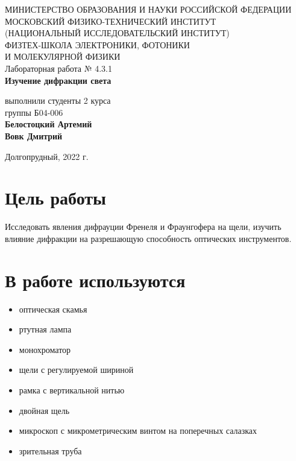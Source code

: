 \documentclass[a4paper,12pt]{article}
\begin{document}
 

\begin{titlepage}
	\begin{center}
		\large 	МИНИСТЕРСТВО ОБРАЗОВАНИЯ И НАУКИ РОССИЙСКОЙ ФЕДЕРАЦИИ\\
				МОСКОВСКИЙ ФИЗИКО-ТЕХНИЧЕСКИЙ ИНСТИТУТ \\
				(НАЦИОНАЛЬНЫЙ ИССЛЕДОВАТЕЛЬСКИЙ ИНСТИТУТ)\\ 
				ФИЗТЕХ-ШКОЛА ЭЛЕКТРОНИКИ, ФОТОНИКИ \\
				И МОЛЕКУЛЯРНОЙ ФИЗИКИ \\
		
		
		\vspace{4.0 cm}
		Лабораторная работа № 4.3.1 \\ 
		\LARGE \textbf{Изучение дифракции света}
	\end{center}
	\vspace{3 cm} \large
	
	\begin{flushright}
		выполнили студенты 2 курса \\
		{группы Б04-006}\\
		\textbf{Белостоцкий Артемий}\\
		\textbf{Вовк Дмитрий}\\
	\end{flushright}
	
	\vfill

	\begin{center}
	Долгопрудный, 2022 г.
	\end{center}
\end{titlepage}                                                                      

\section*{Цель работы}

Исследовать явления дифрауции Френеля и Фраунгофера на щели, изучить влияние дифракции на разрешающую способность оптических инструментов.

\section*{В работе используются}

\begin{itemize}
\item оптическая скамья
\item ртутная лампа
\item монохроматор
\item щели с регулируемой шириной 
\item рамка с вертикальной нитью
\item двойная щель
\item микроскоп с микрометрическим винтом на поперечных салазках
\item зрительная труба
\end{itemize}
\end{document}
